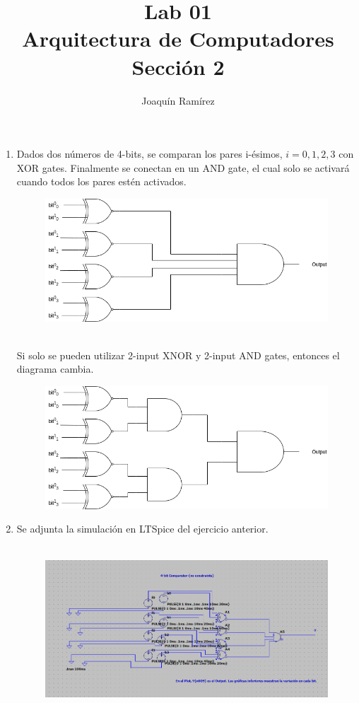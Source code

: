 \documentclass[11pt,a4paper]{article}
\title{Lab 01\\Arquitectura de Computadores \\ Sección 2}
\author{Joaquín Ramírez}
\begin{document}
\maketitle
\begin{enumerate}
\item Dados dos números de 4-bits, se comparan los pares i-ésimos, $i = 0, 1, 2, 3$ con XOR gates. Finalmente se conectan en un AND gate, el cual solo se activará cuando todos los pares estén activados.
\begin{figure}[h!]
\centering
\includegraphics[scale=0.4]{1.png} 
\end{figure}
\\
Si solo se pueden utilizar 2-input XNOR y 2-input AND gates, entonces el diagrama cambia.
\begin{figure}[h!]
\centering
\includegraphics[scale=0.4]{0.png} 
\end{figure}
\item Se adjunta la simulación en LTSpice del ejercicio anterior.
\\
\\
\begin{figure}[h!]
\centering
\includegraphics[scale=0.4]{dia11.png} 

\end{figure}
\end{enumerate}
\end{document}
